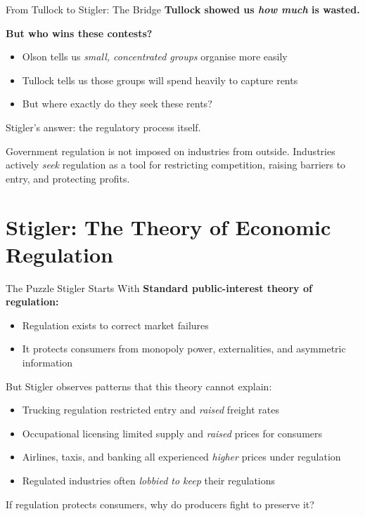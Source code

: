 \documentclass[10pt]{beamer}
\begin{document}
\begin{frame}{From Tullock to Stigler: The Bridge}
\textbf{Tullock showed us \emph{how much} is wasted.}

\vspace{0.1cm}
\textbf{But who wins these contests?}

\begin{itemize}
\item Olson tells us \emph{small, concentrated groups} organise more easily
\item Tullock tells us those groups will spend heavily to capture rents
\item But where exactly do they seek these rents?
\end{itemize}

\vspace{0.2cm}
\alert{Stigler's answer:} the regulatory process itself.

\vspace{0.1cm}
Government regulation is not imposed on industries from outside.
Industries actively \emph{seek} regulation as a tool for restricting competition, raising barriers to entry, and protecting profits.
\end{frame}


\section{Stigler: The Theory of Economic Regulation}

\begin{frame}{The Puzzle Stigler Starts With}
\textbf{Standard public-interest theory of regulation:}
\begin{itemize}
\item Regulation exists to correct market failures
\item It protects consumers from monopoly power, externalities, and asymmetric information
\end{itemize}

\vspace{0.2cm}
\alert{But Stigler observes patterns that this theory cannot explain:}

\begin{itemize}
\item Trucking regulation restricted entry and \emph{raised} freight rates
\item Occupational licensing limited supply and \emph{raised} prices for consumers
\item Airlines, taxis, and banking all experienced \emph{higher} prices under regulation
\item Regulated industries often \emph{lobbied to keep} their regulations
\end{itemize}

\vspace{0.1cm}
\alert{If regulation protects consumers, why do producers fight to preserve it?}
\end{frame}
\end{document}
